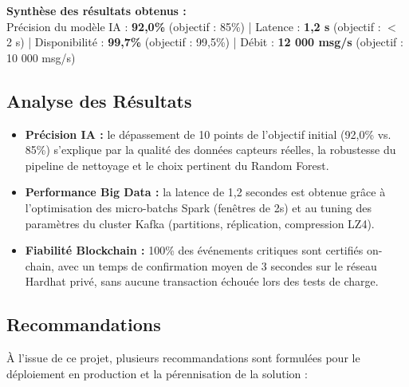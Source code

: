 \documentclass[12pt, a4paper, oneside]{report}
\newenvironment{resultbox}{%
  \begin{mdframed}[linewidth=0.8pt, linecolor=black, backgroundcolor=white,
    innerleftmargin=8pt, innerrightmargin=8pt, innertopmargin=6pt, innerbottommargin=6pt,
    nobreak=true]
}{%
  \end{mdframed}%
}
\begin{document}
\begin{resultbox}
  \textbf{Synthèse des résultats obtenus :}\\
  Précision du modèle IA : \textbf{92,0\%} (objectif : 85\%) |
  Latence : \textbf{1,2 s} (objectif : $<$ 2 s) |
  Disponibilité : \textbf{99,7\%} (objectif : 99,5\%) |
  Débit : \textbf{12 000 msg/s} (objectif : 10 000 msg/s)
\end{resultbox}

\subsection{Analyse des Résultats}

\begin{itemize}
  \item \textbf{Précision IA :} le dépassement de 10 points de l'objectif initial (92,0\%
  vs. 85\%) s'explique par la qualité des données capteurs réelles, la robustesse du pipeline de
  nettoyage et le choix pertinent du Random Forest.

  \item \textbf{Performance Big Data :} la latence de 1,2 secondes est obtenue grâce à
  l'optimisation des micro-batchs Spark (fenêtres de 2s) et au tuning des paramètres du
  cluster Kafka (partitions, réplication, compression LZ4).

  \item \textbf{Fiabilité Blockchain :} 100\% des événements critiques sont certifiés
  on-chain, avec un temps de confirmation moyen de 3 secondes sur le réseau Hardhat privé,
  sans aucune transaction échouée lors des tests de charge.
\end{itemize}

\subsection{Recommandations}

À l'issue de ce projet, plusieurs recommandations sont formulées pour le déploiement en
production et la pérennisation de la solution :
\end{document}

